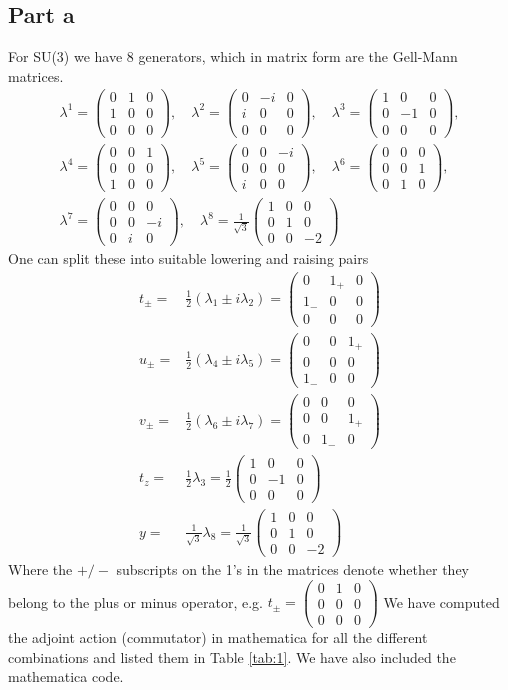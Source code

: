 \documentclass[a4paper,12pt]{article}
\newcommand\matthree[9]{%
	\begin{pmatrix}
		#1 & #2 & #3 \\ #4 & #5 & #6 \\ #7 & #8 & #9
	\end{pmatrix}%
}
\begin{document}
\subsection*{Part a}
For SU(3) we have 8 generators, which in matrix form are the Gell-Mann matrices.
\begin{gather*}
	\lambda^1 = \matthree {0}{1}{0}{1}{0}{0}{0}{0}{0},\quad
	\lambda^2 = \matthree {0}{-i}{0}{i}{0}{0}{0}{0}{0},\quad
	\lambda^3 = \matthree {1}{0}{0}{0}{-1}{0}{0}{0}{0},\\[1ex]
	\lambda^4 = \matthree {0}{0}{1}{0}{0}{0}{1}{0}{0},\quad
	\lambda^5 = \matthree {0}{0}{-i}{0}{0}{0}{i}{0}{0},\quad
	\lambda^6 = \matthree {0}{0}{0}{0}{0}{1}{0}{1}{0},\\[1ex]
	\lambda^7 = \matthree {0}{0}{0}{0}{0}{-i}{0}{i}{0},\quad
	\lambda^8 = \frac{1}{\sqrt{3}} \matthree {1}{0}{0}{0}{1}{0}{0}{0}{-2}
\end{gather*}
One can split these into suitable lowering and raising pairs
\begin{equation}
	\begin{aligned}
		t_\pm=& \frac{1}{2}(\lambda_1\pm i\lambda_2)=
		\matthree {0}{1_+}{0}{1_-}{0}{0}{0}{0}{0}
		\\
		u_\pm=& \frac{1}{2}(\lambda_4\pm i\lambda_5)=
		\matthree {0}{0}{1_+}{0}{0}{0}{1_-}{0}{0}
		\\
		v_\pm=& \frac{1}{2}(\lambda_6\pm i\lambda_7)
		=
		\matthree {0}{0}{0}{0}{0}{1_+}{0}{1_-}{0}
				\\
		t_z=&\frac{1}{2}\lambda_3
			=\frac{1}{2}
		\matthree {1}{0}{0}{0}{-1}{0}{0}{0}{0}
		\\
		y=&\frac{1}{\sqrt{3}}\lambda_8
			=\frac{1}{\sqrt{3}}
		\matthree {1}{0}{0}{0}{1}{0}{0}{0}{-2}
	\end{aligned}
\end{equation}
Where the $+/-$ subscripts on the 1's in the matrices denote whether they belong to the plus or minus operator, e.g. $	t_\pm=
\matthree {0}{1}{0}{0}{0}{0}{0}{0}{0}$
We have computed the adjoint action (commutator) in mathematica for all the different combinations and listed them in Table \ref{tab:1}. We have also included the mathematica code.
\end{document}
